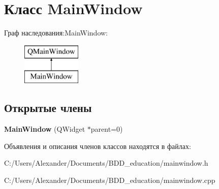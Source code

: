 \hypertarget{class_main_window}{}\section{Класс Main\+Window}
\label{class_main_window}
Граф наследования\+:Main\+Window\+:\begin{figure}[H]
\begin{center}
\leavevmode
\includegraphics[height=2.000000cm]{class_main_window}
\end{center}
\end{figure}
\subsection*{Открытые члены}
\begin{DoxyCompactItemize}
\item 
{\bfseries Main\+Window} (Q\+Widget $\ast$parent=0)\hypertarget{class_main_window_a8b244be8b7b7db1b08de2a2acb9409db}{}\label{class_main_window_a8b244be8b7b7db1b08de2a2acb9409db}

\end{DoxyCompactItemize}


Объявления и описания членов классов находятся в файлах\+:\begin{DoxyCompactItemize}
\item 
C\+:/\+Users/\+Alexander/\+Documents/\+B\+D\+D\+\_\+education/mainwindow.\+h\item 
C\+:/\+Users/\+Alexander/\+Documents/\+B\+D\+D\+\_\+education/mainwindow.\+cpp\end{DoxyCompactItemize}
